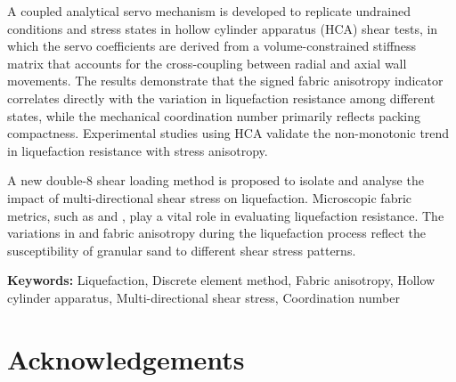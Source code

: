\documentclass[../main]{subfiles}
\begin{document}
A coupled analytical servo mechanism is developed to replicate undrained conditions and stress states in hollow cylinder apparatus (HCA) shear tests, in which the servo coefficients are derived from a volume-constrained stiffness matrix that accounts for the cross-coupling between radial and axial wall movements. The results demonstrate that the signed fabric anisotropy indicator correlates directly with the variation in liquefaction resistance among different \Kzero{} states, while the mechanical coordination number primarily reflects packing compactness. Experimental studies using HCA validate the non-monotonic trend in liquefaction resistance with stress anisotropy.

A new double-8 shear loading method is proposed to isolate and analyse the impact of multi-directional shear stress on liquefaction. Microscopic fabric metrics, such as \Zm{} and \Fc{}, play a vital role in evaluating liquefaction resistance. The variations in \Zm{} and fabric anisotropy during the liquefaction process reflect the susceptibility of granular sand to different shear stress patterns.

\vspace{1em}
\noindent\textbf{Keywords:} Liquefaction, Discrete element method, Fabric anisotropy, Hollow cylinder apparatus, Multi-directional shear stress, Coordination number

\cleardoublepage

\chapter*{Acknowledgements}


\cleardoublepage
\end{document}
